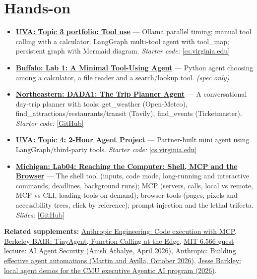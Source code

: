 \documentclass[10pt,oneside]{report}
\begin{document}
\section{Hands-on}
\begin{itemize}
\item \hyperlink{asg-UVA-3}{\textbf{UVA: Topic 3 portfolio: Tool use}} --- Ollama parallel timing; manual tool calling with a calculator; LangGraph multi-tool agent with tool\_\allowbreak{}map; persistent graph with Mermaid diagram. \textit{Starter code:} \href{https://www.cs.virginia.edu/\%7Ermw7my/Courses/AgenticAISpring2026/Topic3Tools/tools.html}{[cs.virginia.edu]}
\item \hyperlink{asg-UB-1}{\textbf{Buffalo: Lab 1: A Minimal Tool-Using Agent}} --- Python agent choosing among a calculator, a file reader and a search/lookup tool. \textit{(spec only)}
\item \hyperlink{asg-NEU-1}{\textbf{Northeastern: DADA1: The Trip Planner Agent}} --- A conversational day-trip planner with tools: get\_\allowbreak{}weather (Open-Meteo), find\_\allowbreak{}attractions/restaurants/transit (Tavily), find\_\allowbreak{}events (Ticketmaster). \textit{Starter code:} \href{https://github.com/agenticllms/lecture-files/tree/main/DADA1}{[GitHub]}
\item \hyperlink{asg-UVA-4}{\textbf{UVA: Topic 4: 2-Hour Agent Project}} --- Partner-built mini agent using LangGraph/third-party tools. \textit{Starter code:} \href{https://www.cs.virginia.edu/\%7Ermw7my/Courses/AgenticAISpring2026/Topic4Exploring/exploring.html}{[cs.virginia.edu]}
\item \hyperlink{asg-UMICH-11}{\textbf{Michigan: Lab04: Reaching the Computer: Shell, MCP and the Browser}} --- The shell tool (inputs, code mode, long-running and interactive commands, deadlines, background runs); MCP (servers, calls, local vs remote, MCP vs CLI, loading tools on demand); browser tools (pages, pixels and accessibility trees, click by reference); prompt injection and the lethal trifecta. \textit{Slides:} \href{https://github.com/eecs498-aase/materials/blob/main/labs/Lab04/slides.pdf}{[GitHub]}
\end{itemize}
\textbf{Related supplements:} \hyperref[sup-codeexec]{Anthropic Engineering: Code execution with MCP}, \hyperref[sup-tinyagent]{Berkeley BAIR: TinyAgent, Function Calling at the Edge}, \hyperref[sup-agentsec]{MIT 6.566 guest lecture: AI Agent Security (Anish Athalye, April 2026)}, \hyperref[sup-anthauto]{Anthropic: Building effective agent automations (Martin and Avilla, October 2026)}, \hyperref[sup-barkley]{Jesse Barkley: local agent demos for the CMU executive Agentic AI program (2026)}.
\end{document}
